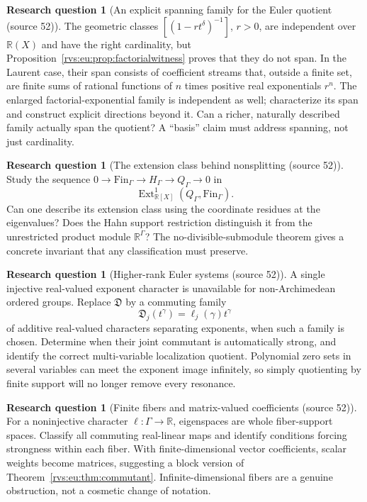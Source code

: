 \documentclass[11pt,letterpaper]{article}
\numberwithin{equation}{section}
\theoremstyle{definition}
\newtheorem{question}[theorem]{Research question}
\theoremstyle{remark}
\newcommand{\R}{\mathbb{R}}
\newcommand{\EuD}{\mathfrak D}%
\newcommand{\FinS}[1]{\mathrm{Fin}_{#1}}%
\begin{document}
\begin{question}[An explicit spanning family for the Euler quotient (source 52)]
The geometric classes $[(1-r t^\delta)^{-1}]$, $r>0$, are independent over $\R(X)$ and have the right cardinality, but Proposition~\ref{rvs:eu:prop:factorialwitness} proves that they do not span. In the Laurent case, their span consists of coefficient streams that, outside a finite set, are finite sums of rational functions of $n$ times positive real exponentials $r^n$. The enlarged factorial-exponential family is independent as well; characterize its span and construct explicit directions beyond it. Can a richer, naturally described family actually span the quotient? A ``basis'' claim must address spanning, not just cardinality.
\end{question}

\begin{question}[The extension class behind nonsplitting (source 52)]
Study the sequence $0\to \FinS{\Gamma}\to H_\Gamma\to Q_\Gamma\to0$ in
\[
 \operatorname{Ext}^1_{\R[X]}(Q_\Gamma,\FinS{\Gamma}).
\]
Can one describe its extension class using the coordinate residues at the eigenvalues? Does the Hahn support restriction distinguish it from the unrestricted product module $\R^\Gamma$? The no-divisible-submodule theorem gives a concrete invariant that any classification must preserve.
\end{question}

\begin{question}[Higher-rank Euler systems (source 52)]
A single injective real-valued exponent character is unavailable for non-Archimedean ordered groups. Replace $\EuD$ by a commuting family
\[
 \EuD_j(t^\gamma)=\ell_j(\gamma)t^\gamma
\]
of additive real-valued characters separating exponents, when such a family is chosen. Determine when their joint commutant is automatically strong, and identify the correct multi-variable localization quotient. Polynomial zero sets in several variables can meet the exponent image infinitely, so simply quotienting by finite support will no longer remove every resonance.
\end{question}

\begin{question}[Finite fibers and matrix-valued coefficients (source 52)]
For a noninjective character $\ell:\Gamma\to\R$, eigenspaces are whole fiber-support spaces. Classify all commuting real-linear maps and identify conditions forcing strongness within each fiber. With finite-dimensional vector coefficients, scalar weights become matrices, suggesting a block version of Theorem~\ref{rvs:eu:thm:commutant}. Infinite-dimensional fibers are a genuine obstruction, not a cosmetic change of notation.
\end{question}
\end{document}
